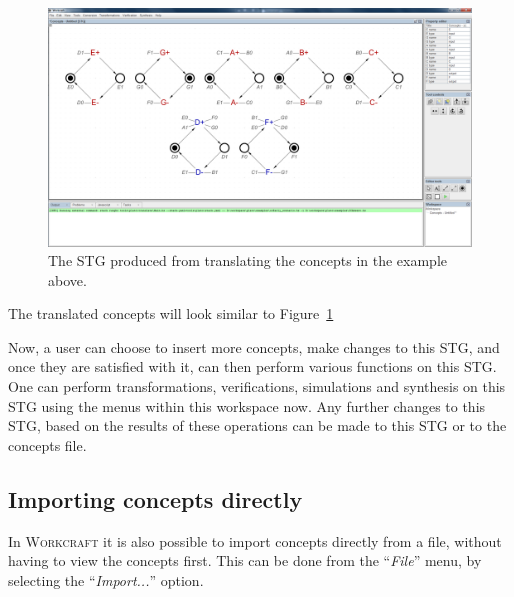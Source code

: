 \documentclass[british,technote,compsoc]{IEEEtran}
\newcommand{\noun}[1]{\textsc{#1}}
\begin{document}
\begin{figure}[H]
\begin{centering}
\includegraphics[scale=0.2]{images/concepts_translated.png}
\par\end{centering}

\begin{centering}
\protect\caption{\label{fig:concepts_translated}The STG produced from translating the concepts in the example above.}

\par\end{centering}

\end{figure}

\noindent The translated concepts will look similar to Figure~\ref{fig:concepts_translated}

Now, a user can choose to insert more concepts, make changes to this STG, and once they are satisfied with it, can then perform various functions on this STG. One can perform 
transformations, verifications, simulations and synthesis on this STG using the menus within this workspace now. Any further changes to this STG, based on the results of these 
operations can be made to this STG or to the concepts file. 

\subsection{Importing concepts directly}

In \noun{Workcraft} it is also possible to import concepts directly from a file, without having to view the concepts first. 
This can be done from the ``\emph{File}'' menu, by selecting the ``\emph{Import...}'' option. 
\end{document}
